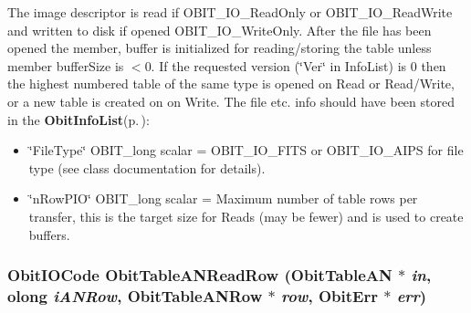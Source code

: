 The image descriptor is read if OBIT\_\-IO\_\-Read\-Only or OBIT\_\-IO\_\-Read\-Write and written to disk if opened OBIT\_\-IO\_\-Write\-Only. After the file has been opened the member, buffer is initialized for reading/storing the table unless member buffer\-Size is $<$0. If the requested version (\char`\"{}Ver\char`\"{} in Info\-List) is 0 then the highest numbered table of the same type is opened on Read or Read/Write, or a new table is created on on Write. The file etc. info should have been stored in the {\bf Obit\-Info\-List}{\rm (p.\,\pageref{structObitInfoList})}: \begin{itemize}
\item \char`\"{}File\-Type\char`\"{} OBIT\_\-long scalar = OBIT\_\-IO\_\-FITS or OBIT\_\-IO\_\-AIPS for file type (see class documentation for details). \item \char`\"{}n\-Row\-PIO\char`\"{} OBIT\_\-long scalar = Maximum number of table rows per transfer, this is the target size for Reads (may be fewer) and is used to create buffers. 
\end{itemize}
\subsubsection{\setlength{\rightskip}{0pt plus 5cm}Obit\-IOCode Obit\-Table\-ANRead\-Row ({\bf Obit\-Table\-AN} $\ast$ {\em in}, {\bf olong} {\em i\-ANRow}, {\bf Obit\-Table\-ANRow} $\ast$ {\em row}, {\bf Obit\-Err} $\ast$ {\em err})}\label{ObitTableAN_8c_a22}


